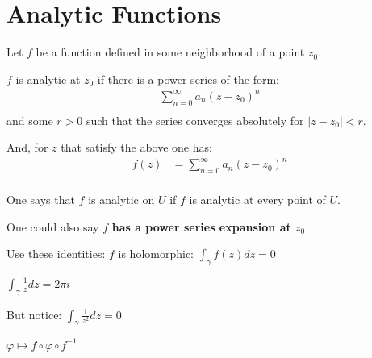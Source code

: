 \section{Analytic Functions}

Let $f$ be a function defined in some neighborhood of a point $z_0$.

\begin{defn}
    $f$ is analytic at $z_0$ if there is a power series of the form:
    \begin{align*}
        \sum_{n = 0}^{\infty} a_n (z - z_0)^n \\
    \end{align*}
    and some $r > 0$ such that the series converges absolutely for $|z - z_0| < r.$

    And, for $z$ that satisfy the above one has:
    \begin{align*}
        f(z) & = \sum_{n = 0}^{\infty} a_n (z - z_0)^n \\
    \end{align*}
\end{defn}

One says that $f$ is analytic on $U$ if $f$ is analytic at every point of $U.$

One could also say $f$ \bfseries has a power series expansion at $z_0.$

Use these identities:
$f$ is holomorphic:
$\int_{\gamma} f(z) dz = 0$

$\int_{\gamma} \frac{1}{z} dz = 2\pi i $

But notice:
$\int_{\gamma} \frac{1}{z^2} dz = 0 $

$\varphi \mapsto f \circ \varphi \circ f^{-1}$